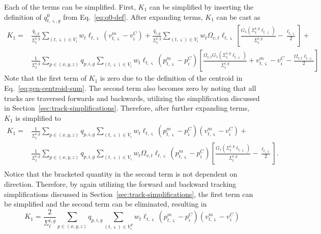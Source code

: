 Each of the terms can be simplified. First, $K_1$ can be simplified by inserting the definition of $q^0_{t,\varsigma,g}$ from Eq.~\ref{eq:q0-def}. After expanding terms, $K_1$ can be cast as
\begin{equation}
\begin{split}
K_1 = &\frac{\overline{q}_{i,g}}{\Sigma_{t}^{i,g}} \sum_{(t,\varsigma) \in V_i} w_t \ell_{t,\varsigma} \left(v^m_{t,\varsigma} - v^C_i \right) + 
 \frac{\overline{q}_{i,g}}{\Sigma_{t}^{i,g}} \sum_{(t,\varsigma) \in V_i} w_t \Omega_{v,t} \ell_{t,\varsigma} \left[\frac{G_1(\Sigma_{t}^{i,g} \ell_{t,\varsigma})}{\Sigma_{t}^{i,g}} - \frac{\ell_{t,\varsigma}}{2}\right] + \\
& \frac{1}{\Sigma_{t}^{i,g}} \sum_{p \in (x,y,z)} q_{p,i,g} \sum_{(t,\varsigma) \in V_i} w_t \ell_{t,\varsigma} \left( p^m_{t,\varsigma} - p^C_i \right) \left[\frac{\Omega_{v,t} G_1(\Sigma_{t}^{i,g} \ell_{t,\varsigma})}{\Sigma_{t}^{i,g}} +  v^m_{t,\varsigma} - v^C_i - \frac{\Omega_{v,t} \ell_{t,\varsigma}}{2} \right]
\end{split}
\end{equation}
Note that the first term of $K_1$ is zero due to the definition of the centroid in Eq.~\ref{eq:gen-centroid-sum}. The second term also becomes zero by noting that all tracks are traversed forwards and backwards, utilizing the simplification discussed in Section~\ref{sec:track-simplifications}. Therefore, after further expanding terms, $K_1$ is simplified to 
\begin{equation}
\begin{split}
K_1 = & \frac{1}{\Sigma_{t}^{i,g}} \sum_{p \in (x,y,z)} q_{p,i,g} \sum_{(t,\varsigma) \in V_i} w_t \ell_{t,\varsigma} \left( p^m_{t,\varsigma} - p^C_i \right) \left(v^m_{t,\varsigma} - v^C_i\right) + \\
& \frac{1}{\Sigma_{t}^{i,g}} \sum_{p \in (x,y,z)} q_{p,i,g} \sum_{(t,\varsigma) \in V_i} w_t \Omega_{v,t} \ell_{t,\varsigma} \left( p^m_{t,\varsigma} - p^C_i \right) \left[\frac{G_1(\Sigma_{t}^{i,g} \ell_{t,\varsigma})}{\Sigma_{t}^{i,g}} - \frac{\ell_{t,\varsigma}}{2} \right]. \\
\end{split}
\end{equation}
Notice that the bracketed quantity in the second term is not dependent on direction. Therefore, by again utilizing the forward and backward tracking simplifications discussed in Section~\ref{sec:track-simplifications}, the first term can be simplified and the second term can be eliminated, resulting in
\begin{equation}
K_1 = \frac{2}{\Sigma_{t}^{i,g}} \sum_{p \in (x,y,z)} q_{p,i,g} \sum_{(t,\varsigma) \in V^F_i} w_t \ell_{t,\varsigma} \left( p^m_{t,\varsigma} - p^C_i \right) \left(v^m_{t,\varsigma} - v^C_i\right)
\end{equation}
